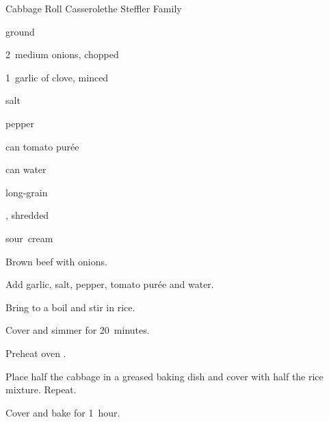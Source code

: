 \begin{recipe}{Cabbage Roll Casserole}{the Steffler Family}{}

\begin{ingredients}
\item \lbs{1\half} ground 
\item 2~medium onions, chopped
\item 1~garlic of clove, minced
\item {} salt
\item \tp{\quarter} pepper
\item {} can tomato purée
\item {} can water
\item \C{\half} long-grain 
\item {} , shredded
\item sour~cream
\end{ingredients}

\begin{directions}
\item Brown beef with onions.
\item Add garlic, salt, pepper, tomato purée and water.
\item Bring to a boil and stir in rice.
\item Cover and simmer for 20~minutes.
\item Preheat oven .
\item Place half the cabbage in a greased baking dish and cover with half the rice mixture. Repeat.
\item Cover and bake for 1~hour.
\end{directions}

\end{recipe}
